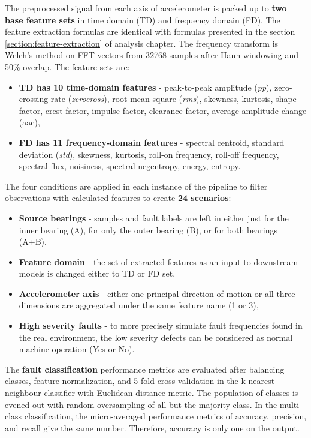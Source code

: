 The preprocessed signal from each axis of accelerometer is packed up to \textbf{two base feature sets} in time domain (TD) and frequency domain (FD). The feature extraction formulas are identical with formulas presented in the section \ref{section:feature-extraction} of analysis chapter. The frequency transform is Welch's method on FFT vectors from 32768 samples after Hann windowing and 50\% overlap. The feature sets are:
\begin{itemize}
\itemsep0pt
\item \textbf{TD has 10 time-domain features} - peak-to-peak amplitude (\emph{pp}), zero-crossing rate (\emph{zerocross}), root mean square (\emph{rms}), skewness, kurtosis, shape factor, crest factor, impulse factor, clearance factor, average amplitude change (aac), 
\item \textbf{FD has 11 frequency-domain features} - spectral centroid, standard deviation (\emph{std}), skewness, kurtosis, roll-on frequency, roll-off frequency, spectral flux, noisiness, spectral negentropy, energy, entropy.
\end{itemize}
 
The four conditions are applied in each instance of the pipeline to filter observations with calculated features to create \textbf{24 scenarios}:
\begin{itemize}
\itemsep0pt
\item \textbf{Source bearings} - samples and fault labels are left in either just for the inner bearing (A), for only the outer bearing (B), or for both bearings (A+B).
\item \textbf{Feature domain} - the set of extracted features as an input to downstream models is changed either to TD or FD set,
\item \textbf{Accelerometer axis} - either one principal direction of motion or all three dimensions are aggregated under the same feature name (1 or 3),
\item \textbf{High severity faults} - to more precisely simulate fault frequencies found in the real environment, the low severity defects can be considered as normal machine operation (Yes or No).
\end{itemize}

The \textbf{fault classification} performance metrics are evaluated after balancing classes, feature normalization, and 5-fold cross-validation in the k-nearest neighbour classifier with Euclidean distance metric. The population of classes is evened out with random oversampling of all but the majority class. In the multi-class classification, the micro-averaged performance metrics of accuracy, precision, and recall give the same number. Therefore, accuracy is only one on the output. 

